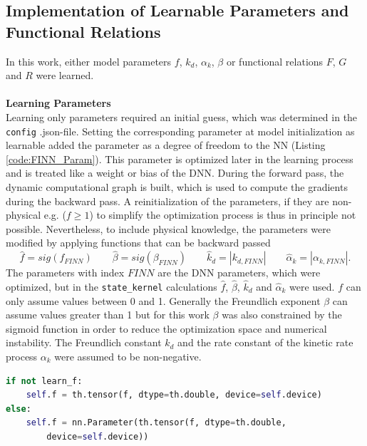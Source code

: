\subsection{Implementation of Learnable Parameters and Functional Relations}
In this work, either model parameters $f$, $k_d$, $\alpha_k$, $\beta$ or functional relations $F$, $G$ and $R$ were learned.\\
\\
\textbf{Learning Parameters}
\\
Learning only parameters required an initial guess, which was determined in the \texttt{config} .json-file. Setting the corresponding parameter at model initialization as learnable added the parameter as a degree of freedom to the NN (Listing \ref{code:FINN_Param}). This parameter is optimized later in the learning process and is treated like a weight or bias of the DNN. During the forward pass, the dynamic computational graph is built, which is used to compute the gradients during the backward pass. A reinitialization of the parameters, if they are non-physical e.g. ($f \geq 1$) to simplify the optimization process is thus in principle not possible. Nevertheless, to include physical knowledge, the parameters were modified by applying functions that can be backward passed
\begin{equation}
\hat{f} = sig(f_{FINN}) \qquad \hat{\beta} = sig(\beta_{FINN}) \qquad \hat{k}_{d} = |k_{d, FINN}| \qquad \hat{\alpha}_{k} = |\alpha_{k,FINN}|.
\end{equation}
The parameters with index $FINN$ are the DNN parameters, which were optimized, but in the \texttt{state\_kernel} calculations $\hat{f}$, $\hat{\beta}$, $\hat{k}_d$ and $\hat{\alpha}_k$ were used. $f$ can only assume values between 0 and 1. Generally the Freundlich exponent $\beta$ can assume values greater than 1 but for this work $\beta$ was also constrained by the sigmoid function in order to reduce the optimization space and numerical instability. The Freundlich constant $k_d$ and the rate constant of the kinetic rate process $\alpha_k$ were assumed to be non-negative.
\begin{lstlisting}[float, language=python, caption={Add (non)learnable parameter $f$ to FINN model.}, label=code:FINN_Param]
if not learn_f:
    self.f = th.tensor(f, dtype=th.double, device=self.device)
else:
    self.f = nn.Parameter(th.tensor(f, dtype=th.double, 
        device=self.device))
\end{lstlisting}
\\
\\
